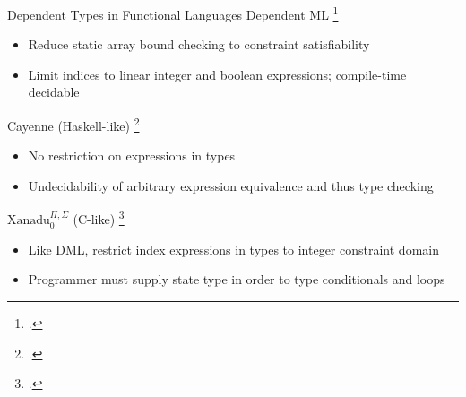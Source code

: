 \documentclass[aspectratio=169]{beamer}
\begin{document}
\begin{frame}{Dependent Types in Functional Languages}
\vspace{-0.08in}
Dependent ML \footcite{xi_eliminating_1998}
\begin{itemize}
    \item Reduce static array bound checking to constraint satisfiability
    \item Limit indices to linear integer and boolean expressions; compile-time decidable
\end{itemize}
Cayenne (Haskell-like) \footcite{augustsson_cayennelanguage_1998}
\begin{itemize}
    \item No restriction on expressions in types
    \item Undecidability of arbitrary expression equivalence and thus type checking
\end{itemize}
$\text{Xanadu}_{0}^{\Pi,\Sigma}$ (C-like) \footcite{xi_imperative_2000}
\begin{itemize}
    \item Like DML, restrict index expressions in types to integer constraint domain
    \item Programmer must supply state type in order to type conditionals and loops
\end{itemize}
    \vspace{0.2in}
\end{frame}

\end{document}
